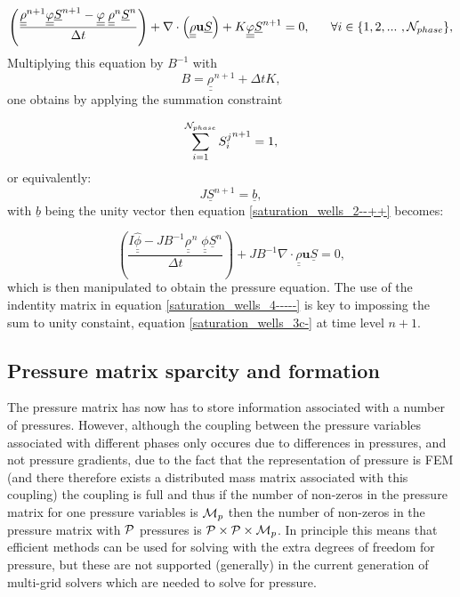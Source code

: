 \begin{equation}\displaystyle
  \left( \frac{
 \underline{\underline{\rho}}^{n+1}\underline{\underline \phi} {\underline S}^{n+1} - \underline{\underline\phi} \; \underline{\underline{\rho}}^{n}   {\underline S}^n
}{\Delta t} \right) + \nabla\cdot\left( \underline{\underline\rho} \mathbf{u} {\underline{S}} \right) +  K\underline{\underline \phi} \underline{S}^{n+1}= 0,
~~~~~ \forall i \in\{ 1,2,...~ , {\cal N}_{phase}\},
\label{saturation_wells_2--++}
\end{equation}
Multiplying this equation by $B^{-1}$ with
\begin{equation}
B= \underline{\underline{\rho^{}}}^{n+1} +\Delta t K,
\label{saturation_wells_2--++--}
\end{equation}
one obtains by
applying the summation constraint

\begin{equation}
\sum\limits_{i=1}^{{\cal N}_{phase}}
{S_i^{j}}^{n+1}
= 1,
\label{saturation_wells_3c-}
\end{equation}
or equivalently:
\begin{equation}
 J
\underline{S}^{n+1}
= \underline{b},
\label{saturation_wells_3c-b}
\end{equation}
with $\underline{b}$ being the unity vector then
equation
\ref{saturation_wells_2--++} becomes:

\begin{equation}
\left(  \frac{
I \hat{ \underline{\underline \phi} }
-
J
B^{-1} \underline{\underline{\rho^{}}}^{n} \; \underline{\underline \phi}
\underline{S}^n
}
{\Delta t}
\right)
+
J
B^{-1}
\nabla\cdot \underline{\underline\rho} \mathbf{u} {\underline S}
= 0,
\label{saturation_wells_4-----}
\end{equation}
which is then manipulated to obtain the pressure equation.
The use of the indentity matrix in equation \ref{saturation_wells_4-----}
is key to impossing the sum to unity constaint, equation \ref{saturation_wells_3c-}
at time level $n+1$.



\subsection{Pressure matrix sparcity and formation}
\label{Pressure matrix sparcity}
The pressure matrix has now has to store information associated with a number of pressures.
However, although the coupling between the pressure variables associated with different phases only occures
due to  differences in pressures, and not pressure gradients, due to the fact that the representation of
pressure is FEM (and there therefore exists a distributed mass matrix associated with this coupling)
the coupling is full and thus if the number of non-zeros in the pressure matrix
for one pressure variables is ${\cal M}_p$ then the number of non-zeros in the pressure
matrix with ${\cal P}$ pressures is  ${\cal P}\times{\cal P}\times{\cal M}_p$.
In principle this means that efficient methods can be used for solving with the extra degrees of
freedom for pressure, but these are not supported (generally) in the current generation of
multi-grid solvers which are needed to solve for pressure.

